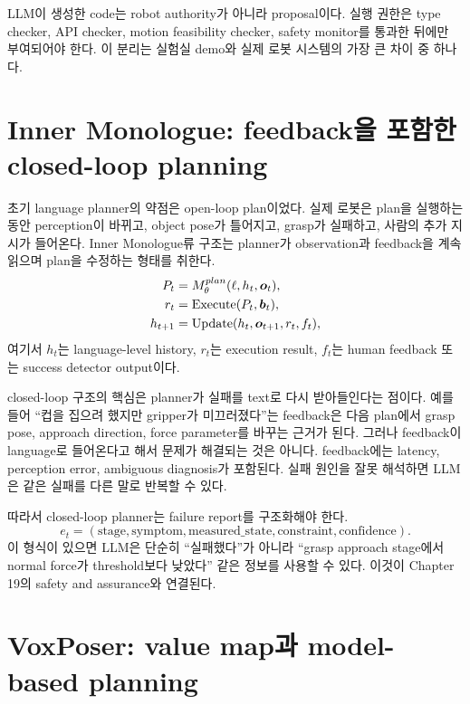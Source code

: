 \begin{tcolorbox}[title={Engineering note: generated code is an interface, not authority}]
LLM이 생성한 code는 robot authority가 아니라 proposal이다. 실행 권한은 type checker, API checker, motion feasibility checker, safety monitor를 통과한 뒤에만 부여되어야 한다. 이 분리는 실험실 demo와 실제 로봇 시스템의 가장 큰 차이 중 하나다.
\end{tcolorbox}

\section{Inner Monologue: feedback을 포함한 closed-loop planning}

초기 language planner의 약점은 open-loop plan이었다. 실제 로봇은 plan을 실행하는 동안 perception이 바뀌고, object pose가 틀어지고, grasp가 실패하고, 사람의 추가 지시가 들어온다. Inner Monologue류 구조는 planner가 observation과 feedback을 계속 읽으며 plan을 수정하는 형태를 취한다.
\begin{align}
  P_t &= M_{\theta}^{plan}(\ell,h_t,\bm{o}_t), \\
  r_t &= \mathrm{Execute}(P_t,\bm{b}_t), \\
  h_{t+1} &= \mathrm{Update}(h_t,\bm{o}_{t+1},r_t,f_t),
  \label{eq:inner-monologue-loop}
\end{align}
여기서 $h_t$는 language-level history, $r_t$는 execution result, $f_t$는 human feedback 또는 success detector output이다.

closed-loop 구조의 핵심은 planner가 실패를 text로 다시 받아들인다는 점이다. 예를 들어 ``컵을 집으려 했지만 gripper가 미끄러졌다''는 feedback은 다음 plan에서 grasp pose, approach direction, force parameter를 바꾸는 근거가 된다. 그러나 feedback이 language로 들어온다고 해서 문제가 해결되는 것은 아니다. feedback에는 latency, perception error, ambiguous diagnosis가 포함된다. 실패 원인을 잘못 해석하면 LLM은 같은 실패를 다른 말로 반복할 수 있다.

따라서 closed-loop planner는 failure report를 구조화해야 한다.
\begin{equation}
  e_t
  =
  (\mathrm{stage},\mathrm{symptom},\mathrm{measured\_state},
  \mathrm{constraint},\mathrm{confidence}).
  \label{eq:failure-report}
\end{equation}
이 형식이 있으면 LLM은 단순히 ``실패했다''가 아니라 ``grasp approach stage에서 normal force가 threshold보다 낮았다'' 같은 정보를 사용할 수 있다. 이것이 Chapter 19의 safety and assurance와 연결된다.

\section{VoxPoser: value map과 model-based planning}

